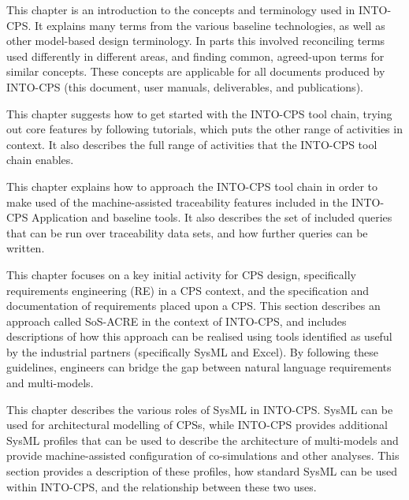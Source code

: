 \begin{description}[noitemsep]
  \item[Chapter~\ref{sec:concepts}: Concepts and Terminology] This chapter is an introduction to the concepts and terminology used in INTO-CPS. It explains many terms from the various baseline technologies, as well as other model-based design terminology. In parts this involved reconciling terms used differently in different areas, and finding common, agreed-upon terms for similar concepts. These concepts are applicable for all documents produced by INTO-CPS (this document, user manuals, deliverables, and publications).

  \item[Chapter~\ref{sec:workflows}: Getting Started with INTO-CPS] This chapter suggests how to get started with the INTO-CPS tool chain, trying out core features by following tutorials, which puts the other range of activities in context. It also describes the full range of activities that the INTO-CPS tool chain enables.

  \item[Chapter~\ref{sec:trace}: Traceability and Provenance] This chapter explains how to approach the INTO-CPS tool chain in order to make used of the machine-assisted traceability features included in the INTO-CPS Application and baseline tools. It also describes the set of included queries that can be run over traceability data sets, and how further queries can be written.

  \item[Chapter~\ref{sec:reqeng}: Requirements Engineering] This chapter focuses on a key initial activity for CPS design, specifically requirements engineering (RE) in a CPS context, and the specification and documentation of requirements placed upon a CPS. This section describes an approach called SoS-ACRE in the context of INTO-CPS, and includes descriptions of how this approach can be realised using tools identified as useful by the industrial partners (specifically SysML and Excel). By following these guidelines, engineers can bridge the gap between natural language requirements and multi-models.

  \item[Chapter~\ref{sec:sysml}: SysML and Multi-modelling] This chapter describes the various roles of SysML in INTO-CPS. SysML can be used for architectural modelling of CPSs, while INTO-CPS provides additional SysML profiles that can be used to describe the architecture of multi-models and provide machine-assisted configuration of co-simulations and other analyses. This section provides a description of these profiles, how standard SysML can be used within INTO-CPS, and the relationship between these two uses.


\end{description}
